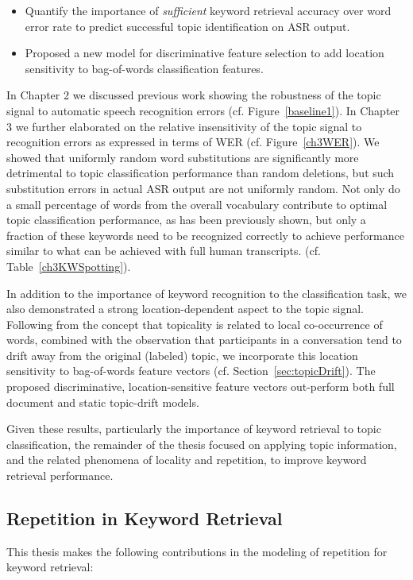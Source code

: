 \begin{itemize}
\item Quantify the importance of \textit{sufficient} keyword retrieval accuracy over word error rate to predict successful topic identification on ASR output.
\item Proposed a new model for discriminative feature selection to add location sensitivity to bag-of-words classification features.
\end{itemize}

In Chapter 2 we discussed previous work showing the robustness of the topic signal to automatic speech recognition errors (cf. Figure~\ref{baseline1}).  In Chapter 3 we further elaborated on the relative insensitivity of the topic signal to recognition errors as expressed in terms of WER (cf. Figure~\ref{ch3WER}). We showed that uniformly random word substitutions are significantly more detrimental to topic classification performance than random deletions, but such substitution errors in actual ASR output are not uniformly random.  Not only do a small percentage of words from the overall vocabulary contribute to optimal topic classification performance, as has been previously shown, but only a fraction of these keywords need to be recognized correctly to achieve performance similar to what can be achieved with full human transcripts.  (cf. Table~\ref{ch3KWSpotting}).

In addition to the importance of keyword recognition to the classification task, we also demonstrated a strong location-dependent aspect to the topic signal.  Following from the concept that topicality is related to local co-occurrence of words, combined with the observation that participants in a conversation tend to drift away from the original (labeled) topic, we incorporate this location sensitivity to bag-of-words feature vectors (cf. Section~\ref{sec:topicDrift}).  The proposed discriminative, location-sensitive feature vectors out-perform both full document and static topic-drift models.  

Given these results, particularly the importance of keyword retrieval to topic classification, the remainder of the thesis focused on applying topic information, and the related phenomena of locality and repetition, to improve keyword retrieval performance.

\subsection{Repetition in Keyword Retrieval}
This thesis makes the following contributions in the modeling of repetition for keyword retrieval:

